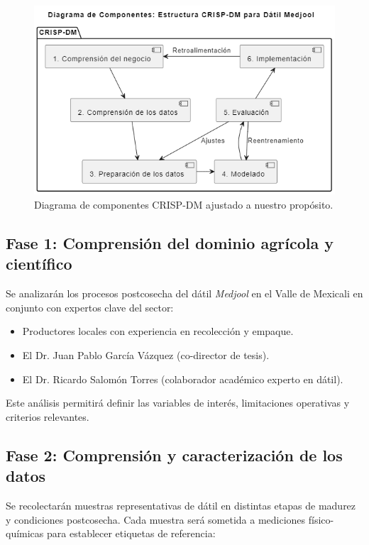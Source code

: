 \begin{figure}[th]
\centering
\includegraphics[scale=0.75]{Figures/componentes.png}
\decoRule
\caption[CRISP-DM]{Diagrama de componentes CRISP-DM ajustado a nuestro propósito.}
\label{fig:Componentes_CRISP-DM}
\end{figure}

\subsection{Fase 1: Comprensión del dominio agrícola y científico}

Se analizarán los procesos postcosecha del dátil \textit{Medjool} en el Valle de Mexicali en conjunto con expertos clave del sector:\\

\begin{itemize}
    \item Productores locales con experiencia en recolección y empaque.
    \item El Dr. Juan Pablo García Vázquez (co-director de tesis).
    \item El Dr. Ricardo Salomón Torres (colaborador académico experto en dátil).
\end{itemize}

Este análisis permitirá definir las variables de interés, limitaciones operativas y criterios relevantes.

\subsection{Fase 2: Comprensión y caracterización de los datos}

Se recolectarán muestras representativas de dátil en distintas etapas de madurez y condiciones postcosecha. Cada muestra será sometida a mediciones físico-químicas para establecer etiquetas de referencia:

